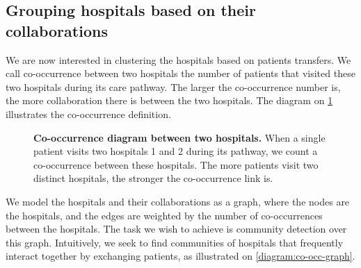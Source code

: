 \subsection{Grouping hospitals based on their collaborations}

We are now interested in clustering the hospitals based on patients transfers.
We call co-occurrence between two hospitals the number of patients that visited
these two hospitals during its care pathway. The larger the co-occurrence number
is, the more collaboration there is between the two hospitals. The diagram
on \cref{diagram:co-occ} illustrates the co-occurrence definition.

\begin{figure}[!h]
    \centering

    \caption{
        \textbf{Co-occurrence diagram between two hospitals.} When a single
        patient visits two hospitals 1 and 2 during its pathway, we count
        a co-occurrence between these hospitals. The more patients visit
        two distinct hospitals, the stronger the co-occurrence link is.
    }
    \label{diagram:co-occ}
\end{figure}

We model the hospitals and their collaborations as a graph, where the nodes are
the hospitals, and the edges are weighted by the number of co-occurrences
between the hospitals. The task we wish to achieve is community detection over
this graph. Intuitively, we seek to find communities of hospitals that
frequently interact together by exchanging patients, as illustrated on
\cref{diagram:co-occ-graph}.

